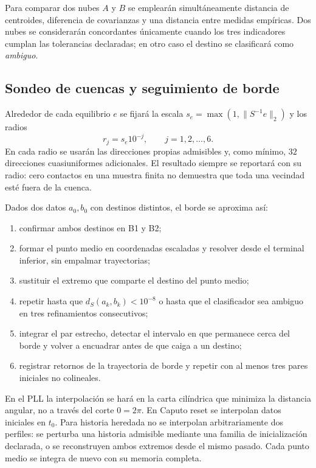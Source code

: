 Para comparar dos nubes \(A\) y \(B\) se emplearán simultáneamente distancia
de centroides, diferencia de covarianzas y una distancia entre medidas
empíricas. Dos nubes se considerarán concordantes únicamente cuando los tres
indicadores cumplan las tolerancias declaradas; en otro caso el destino se
clasificará como \emph{ambiguo}.

\ifHAFOBasinMaterial
\subsection{Sondeo de cuencas y seguimiento de borde}
\label{camp:edge-tracking}

Alrededor de cada equilibrio \(e\) se fijará la escala
\(s_e=\max(1,\lVert S^{-1}e\rVert_2)\) y los radios
\begin{equation}
 r_j=s_e10^{-j},\qquad j=1,2,\ldots,6.
 \label{camp:eq-equilibrium-radii}
\end{equation}
En cada radio se usarán las direcciones propias admisibles y, como mínimo,
\(32\) direcciones cuasiuniformes adicionales. El resultado siempre se
reportará con su radio: cero contactos en una muestra finita no demuestra que
toda una vecindad esté fuera de la cuenca.

Dados dos datos \(a_0,b_0\) con destinos distintos, el borde se aproxima así:

\begin{enumerate}
  \item confirmar ambos destinos en B1 y B2;
  \item formar el punto medio en coordenadas escaladas y resolver desde el
        terminal inferior, sin empalmar trayectorias;
  \item sustituir el extremo que comparte el destino del punto medio;
  \item repetir hasta que \(d_S(a_k,b_k)<10^{-8}\) o hasta que el clasificador
        sea ambiguo en tres refinamientos consecutivos;
  \item integrar el par estrecho, detectar el intervalo en que permanece cerca
        del borde y volver a encuadrar antes de que caiga a un destino;
  \item registrar retornos de la trayectoria de borde y repetir con al menos
        tres pares iniciales no colineales.
\end{enumerate}

En el PLL la interpolación se hará en la carta cilíndrica que minimiza la
distancia angular, no a través del corte \(0=2\pi\). En Caputo reset se
interpolan datos iniciales en \(t_0\). Para historia heredada no se interpolan
arbitrariamente dos perfiles: se perturba una historia admisible mediante una
familia de inicialización declarada, o se reconstruyen ambos extremos desde
el mismo pasado. Cada punto medio se integra de nuevo con su memoria completa.

